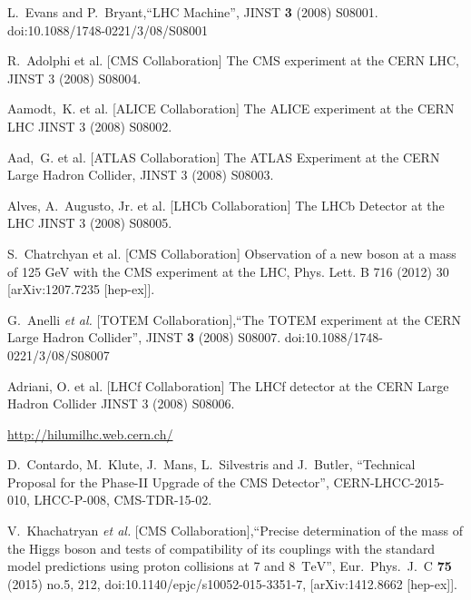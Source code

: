 \begin{thebibliography}{1}


 L.~Evans and P.~Bryant,``LHC Machine'',  JINST {\bf 3} (2008) S08001.  doi:10.1088/1748-0221/3/08/S08001
  
 R.~Adolphi et al. [CMS Collaboration] The CMS experiment at the CERN LHC,
JINST 3 (2008) S08004.

 Aamodt,~K. et al. [ALICE Collaboration] The ALICE experiment at the CERN
LHC JINST 3 (2008) S08002.

Aad,~G. et al. [ATLAS Collaboration] The ATLAS Experiment at the CERN Large
Hadron Collider, JINST 3 (2008) S08003. 

Alves, A.~Augusto, Jr. et al. [LHCb Collaboration] The LHCb Detector at the LHC
JINST 3 (2008) S08005.

 S.~Chatrchyan et al. [CMS Collaboration] Observation of a new boson at a mass of 125 GeV with the CMS experiment at the LHC, Phys. Lett. B 716 (2012) 30 [arXiv:1207.7235 [hep-ex]].

 G.~Anelli {\it et al.} [TOTEM Collaboration],``The TOTEM experiment at the CERN Large Hadron Collider'', JINST {\bf 3} (2008) S08007. doi:10.1088/1748-0221/3/08/S08007

Adriani, O. et al. [LHCf Collaboration] The LHCf detector at the CERN Large
Hadron Collider JINST 3 (2008) S08006.

 \url{http://hilumilhc.web.cern.ch/} 

 D.~Contardo, M.~Klute, J.~Mans, L.~Silvestris and J.~Butler, ``Technical Proposal for the Phase-II Upgrade of the CMS Detector'',  CERN-LHCC-2015-010, LHCC-P-008, CMS-TDR-15-02.

  V.~Khachatryan {\it et al.} [CMS Collaboration],``Precise determination of the mass of the Higgs boson and tests of compatibility of its couplings with the standard model predictions using proton collisions at 7 and 8 $\,\text {TeV}$'', Eur.\ Phys.\ J.\ C {\bf 75} (2015) no.5,  212,
  doi:10.1140/epjc/s10052-015-3351-7, [arXiv:1412.8662 [hep-ex]].


\end{thebibliography}
